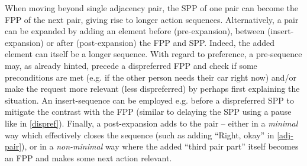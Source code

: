 \documentclass[11pt]{article}
\begin{document}
{    %
    When moving beyond single adjacency pair, the SPP of one pair can become the FPP of the next pair, giving rise to longer action sequences. 
    Alternatively, a pair can be expanded by adding an element before (pre-expansion), between (insert-expansion) or after (post-expansion) the FPP and SPP. Indeed, the added element can itself be a longer sequence.
    With regard to preference, a pre-sequence may, as already hinted, precede a dispreferred FPP and check if some preconditions are met (e.g. if the other person needs their car right now) and/or make the request more relevant (less dispreferred) by perhaps first explaining the situation.
    An insert-sequence can be employed e.g. before a dispreferred SPP to mitigate the contrast with the FPP (similar to delaying the SPP using a pause like in \autoref{dispref}).
    Finally, a post-expansion adds to the pair -- either in a \textit{minimal} way which effectively closes the sequence (such as adding ``Right, okay'' in \autoref{adj-pair}), or in a \textit{non-minimal} way where the added ``third pair part'' itself becomes an FPP and makes some next action relevant.
}
\end{document}
